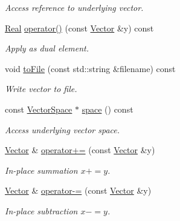 \begin{DoxyCompactItemize}
\begin{DoxyCompactList}\small\item\em Access reference to underlying vector. \end{DoxyCompactList}\item 
\hyperlink{classSpacy_1_1Real}{Real} \hyperlink{classSpacy_1_1FEniCS_1_1Vector_a99a75031c47961b9ef1161197c4d3f8e_a99a75031c47961b9ef1161197c4d3f8e}{operator()} (const \hyperlink{classSpacy_1_1FEniCS_1_1Vector}{Vector} \&y) const 
\begin{DoxyCompactList}\small\item\em Apply as dual element. \end{DoxyCompactList}\item 
void \hyperlink{classSpacy_1_1FEniCS_1_1Vector_ad16ebdcfce3c1e561873506c351bc905_ad16ebdcfce3c1e561873506c351bc905}{to\+File} (const std\+::string \&filename) const 
\begin{DoxyCompactList}\small\item\em Write vector to file. \end{DoxyCompactList}\item 
const \hyperlink{classSpacy_1_1VectorSpace}{Vector\+Space} $\ast$ \hyperlink{classSpacy_1_1VectorBase_a95e87ce98f5a7646055d4e87e6024044_a95e87ce98f5a7646055d4e87e6024044}{space} () const 
\begin{DoxyCompactList}\small\item\em Access underlying vector space. \end{DoxyCompactList}\item 
\hyperlink{classSpacy_1_1FEniCS_1_1Vector}{Vector} \& \hyperlink{classSpacy_1_1SupportedOperatorBase_a9d52829c0e1fcafab1f2a3de17379633_a9d52829c0e1fcafab1f2a3de17379633}{operator+=} (const \hyperlink{classSpacy_1_1FEniCS_1_1Vector}{Vector} \&y)
\begin{DoxyCompactList}\small\item\em In-\/place summation $ x+=y$. \end{DoxyCompactList}\item 
\hyperlink{classSpacy_1_1FEniCS_1_1Vector}{Vector} \& \hyperlink{classSpacy_1_1SupportedOperatorBase_af21496412c35e4afa59779b4fe1b67d5_af21496412c35e4afa59779b4fe1b67d5}{operator-\/=} (const \hyperlink{classSpacy_1_1FEniCS_1_1Vector}{Vector} \&y)
\begin{DoxyCompactList}\small\item\em In-\/place subtraction $ x-=y$. \end{DoxyCompactList}\item 

\end{DoxyCompactItemize}
